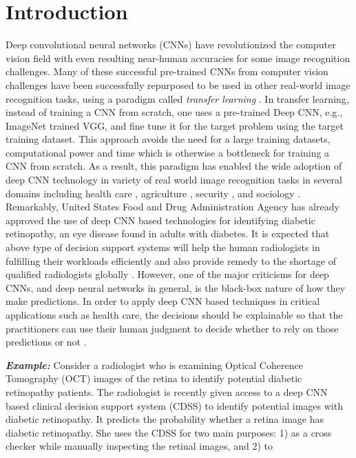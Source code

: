 \section{Introduction}
Deep convolutional neural networks (CNNs) \cite{alexnet, vggnet} have revolutionized the computer vision field with even resulting near-human accuracies for some image recognition challenges.
Many of these successful pre-trained CNNs from computer vision challenges have been successfully repurposed to be used in other real-world image recognition tasks, using a paradigm called \textit{transfer learning} \cite{transfer-learning-factors}.
In transfer learning, instead of training a CNN from scratch, one uses a pre-trained Deep CNN, e.g., ImageNet trained VGG, and fine tune it for the target problem using the target training dataset.
This approach avoids the need for a large training datasets, computational power and time which is otherwise a bottleneck for training a CNN from scratch.
As a result, this paradigm has enabled the wide adoption of deep CNN technology in variety of real world image recognition tasks in several domains including health care \cite{kermany2018identifying, islam2017abnormality}, agriculture \cite{mohanty2016using}, security \cite{arbabzadah2016identifying}, and sociology \cite{wang2017deep}.
Remarkably, United States Food and Drug Administration Agency has already approved the use of deep CNN based technologies for identifying diabetic retinopathy, an eye disease found in adults with diabetes.
It is expected that above type of decision support systems will help the human radiologists in fulfilling their workloads efficiently and also provide remedy to the shortage of qualified radiologists globally \cite{radiologistshortage}.
However, one of the major criticisms for deep CNNs, and deep neural networks in general, is the black-box nature of how they make predictions.
In order to apply deep CNN based techniques in critical applications such as health care, the decisions should be explainable so that the practitioners can use their human judgment to decide whether to rely on those predictions or not \cite{jung2017deep}.


\textbf{\textit{Example:}} Consider a radiologist who is examining Optical Coherence Tomography (OCT) images of the retina to identify potential diabetic retinopathy patients.
The radiologist is recently given access to a deep CNN based clinical decision support system (CDSS) to identify potential images with diabetic retinopathy. 
It predicts the probability whether a retina image has diabetic retinopathy.
She uses the CDSS for two main purposes: 1) as a cross checker while manually inspecting the retinal images, and 2) to   

